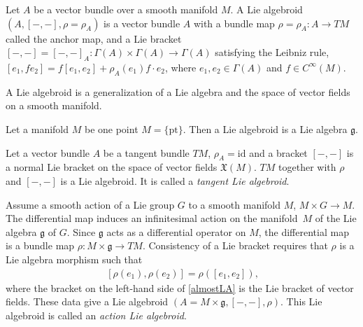 \documentclass[pdftex]{sigma}
\numberwithin{equation}{section}
\newcommand{\rhoa}{{\rho_A}}
\begin{document}
\begin{Definition}
Let $A$ be a vector bundle over a smooth manifold $M$.
A Lie algebroid $(A, [-,-], \rho=\rhoa)$ is a vector bundle $A$ with
a bundle map $\rho=\rhoa\colon A \rightarrow TM$ called the anchor map,
and a Lie bracket
$[-,-]= [-,-]_A\colon \Gamma(A) \times \Gamma(A) \rightarrow \Gamma(A)$
satisfying the Leibniz rule,
$
[e_1, fe_2] = f [e_1, e_2] + \rhoa(e_1) f \cdot e_2$,
where $e_1, e_2 \in \Gamma(A)$ and $f \in C^{\infty}(M)$.
\end{Definition}
%
A Lie algebroid is a generalization of a Lie algebra and the space of vector fields on a smooth manifold.
\begin{Example}
Let a manifold $M$ be one point $M = \{\mathrm{pt} \}$.
Then a Lie algebroid is a Lie algebra $\mathfrak{g}$.
\end{Example}
\begin{Example}\label{tangentLA}
Let a vector bundle $A$ be a tangent bundle $TM$, $\rhoa = \mathrm{id}$
and a bracket $[-,-]$ is a normal Lie bracket
on the space of vector fields $\mathfrak{X}(M)$.
$TM$ together with $\rho$ and $[-,-]$ is a Lie algebroid.
It is called a \textit{tangent Lie algebroid}.
\end{Example}

\begin{Example}\label{actionLA}
Assume a smooth action of a Lie group $G$ to a smooth manifold $M$,
{$M \times G \rightarrow M$.}
The differential map induces an infinitesimal action on the manifold~$M$ of the Lie algebra $\mathfrak{g}$ of $G$.
Since $\mathfrak{g}$ acts as a differential operator on $M$,
the differential map
is a bundle map $\rho\colon M \times \mathfrak{g} \rightarrow TM$.
Consistency of a Lie bracket requires that $\rho$ is
a Lie algebra morphism such that
\begin{gather}
~[\rho(e_1), \rho(e_2)] = \rho([e_1, e_2]),
\label{almostLA}
\end{gather}
where the bracket on the left-hand side
of \eqref{almostLA} is the Lie bracket of vector fields.
These data give a Lie algebroid $(A= M \times \mathfrak{g}, [-,-], \rho)$.
This Lie algebroid is called an \textit{action Lie algebroid}.
\end{Example}
\end{document}
